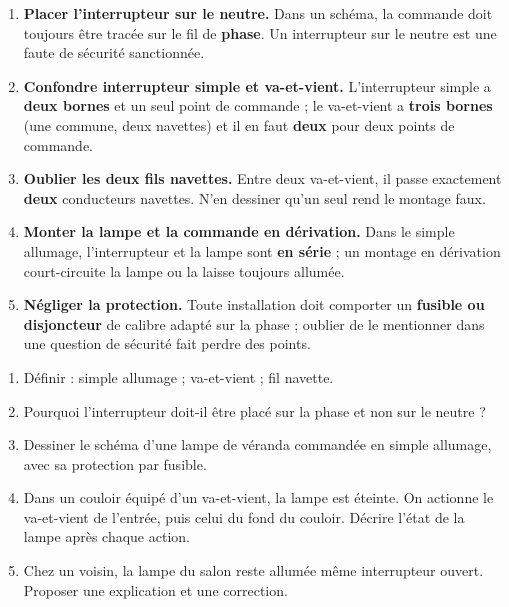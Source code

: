 \documentclass[11pt]{article}
\begin{document}
\begin{attention}
\begin{enumerate}
\item \textbf{Placer l'interrupteur sur le neutre.} Dans un schéma, la commande doit toujours être tracée sur le fil de \textbf{phase}. Un interrupteur sur le neutre est une faute de sécurité sanctionnée.
\item \textbf{Confondre interrupteur simple et va-et-vient.} L'interrupteur simple a \textbf{deux bornes} et un seul point de commande ; le va-et-vient a \textbf{trois bornes} (une commune, deux navettes) et il en faut \textbf{deux} pour deux points de commande.
\item \textbf{Oublier les deux fils navettes.} Entre deux va-et-vient, il passe exactement \textbf{deux} conducteurs navettes. N'en dessiner qu'un seul rend le montage faux.
\item \textbf{Monter la lampe et la commande en dérivation.} Dans le simple allumage, l'interrupteur et la lampe sont \textbf{en série} ; un montage en dérivation court-circuite la lampe ou la laisse toujours allumée.
\item \textbf{Négliger la protection.} Toute installation doit comporter un \textbf{fusible ou disjoncteur} de calibre adapté sur la phase ; oublier de le mentionner dans une question de sécurité fait perdre des points.
\end{enumerate}
\end{attention}

\begin{exercice}
\begin{enumerate}
\item Définir : simple allumage ; va-et-vient ; fil navette.
\item Pourquoi l'interrupteur doit-il être placé sur la phase et non sur le neutre ?
\item Dessiner le schéma d'une lampe de véranda commandée en simple allumage, avec sa protection par fusible.
\item Dans un couloir équipé d'un va-et-vient, la lampe est éteinte. On actionne le va-et-vient de l'entrée, puis celui du fond du couloir. Décrire l'état de la lampe après chaque action.
\item Chez un voisin, la lampe du salon reste allumée même interrupteur ouvert. Proposer une explication et une correction.
\end{enumerate}
\end{exercice}
\end{document}

